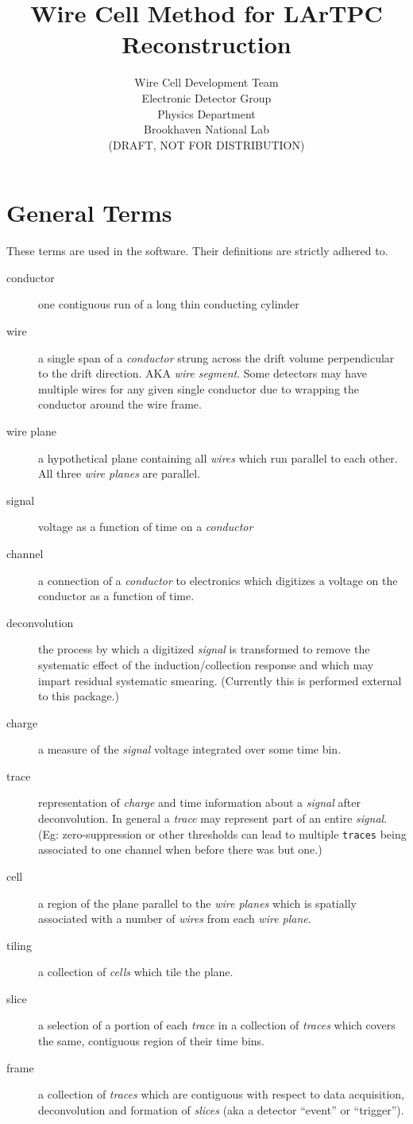 \documentclass[letter]{article}
\title{Wire Cell Method for LArTPC Reconstruction}
\author{Wire Cell Development Team\\Electronic Detector
  Group\\Physics Department\\Brookhaven National Lab\\(DRAFT, NOT FOR DISTRIBUTION)}
\begin{document}
\maketitle

\section{General Terms}

These terms are used in the software.
Their definitions are strictly adhered to.

\begin{description}
\item[conductor] one contiguous run of a long thin conducting cylinder  
\item[wire] a single span of a \textit{conductor} strung across the drift
  volume perpendicular to the drift direction.
  AKA \textit{wire segment}.
  Some detectors may have multiple wires for any given single
  conductor due to wrapping the conductor around the wire frame.
\item[wire plane] a hypothetical plane containing all \textit{wires} which run
  parallel to each other.
  All three \textit{wire planes} are parallel.
\item[signal] voltage as a function of time on a \textit{conductor}
\item[channel] a connection of a \textit{conductor} to electronics
  which digitizes a voltage on the conductor as a function of time.
\item[deconvolution] the process by which a digitized \textit{signal} is
  transformed to remove the systematic effect of the
  induction/collection response and which may impart residual
  systematic smearing.
  (Currently this is performed external to this package.)
\item[charge] a measure of the \textit{signal} voltage integrated over
  some time bin.
\item[trace] representation of \textit{charge} and
  time information about a \textit{signal} after deconvolution.
  In general a \textit{trace} may represent part of an entire
  \textit{signal}.
  (Eg: zero-suppression or other thresholds can lead to multiple
  \texttt{traces} being associated to one channel when before there
  was but one.)
\item[cell] a region of the plane parallel to the \textit{wire planes}
  which is spatially associated with a number of \textit{wires} from
  each \textit{wire plane}.
\item[tiling] a collection of \textit{cells} which tile the plane.
\item[slice] a selection of a portion of each \textit{trace} in a
  collection of \textit{traces} which covers the same, contiguous
  region of their time bins.
\item[frame] a collection of \textit{traces} which are contiguous with
  respect to data acquisition, deconvolution and formation of
  \textit{slices} (aka a detector ``event'' or ``trigger'').
\end{description}
\end{document}
